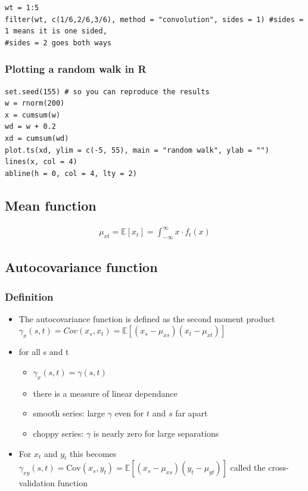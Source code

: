 \documentclass{article}
\begin{document}
\begin{lstlisting}
wt = 1:5
filter(wt, c(1/6,2/6,3/6), method = "convolution", sides = 1) #sides = 1 means it is one sided,
#sides = 2 goes both ways
\end{lstlisting}

\subsubsection{Plotting a random walk in R}
\begin{lstlisting}
set.seed(155) # so you can reproduce the results
w = rnorm(200)
x = cumsum(w)
wd = w + 0.2
xd = cumsum(wd)
plot.ts(xd, ylim = c(-5, 55), main = "random walk", ylab = "")
lines(x, col = 4)
abline(h = 0, col = 4, lty = 2)
\end{lstlisting}


\subsection{Mean function}

\begin{align*}
    \mu_{xt} = \mathbb{E}[x_t] = \int_{-\infty}^\infty x\cdot f_t(x)
\end{align*}

\subsection{Autocovariance function}
\subsubsection{Definition}
\begin{itemize}
    \item The autocovariance function is defined as the second moment product $\gamma_x (s,t) = Cov(x_s,x_t) = \mathbb{E}[(x_s - \mu_{xs}) (x_t - \mu_{xt})]$
    \item for all s and t
    \begin{itemize}
        \item $\gamma_x (s,t) = \gamma(s,t)$
        \item there is a measure of linear dependance
        \item smooth series: large $\gamma$ even for $t$ and $s$ far apart
        \item choppy series: $\gamma$ is nearly zero for large separations
    \end{itemize}
    \item For $x_t$ and $y_t$ this becomes $\gamma_{xy}(s,t) = \text{Cov}(x_s,y_t) = \mathbb{E}[(x_s - \mu_{xs})(y_t - \mu_{yt})]$ called the cross-validation function
\end{itemize}
\end{document}
